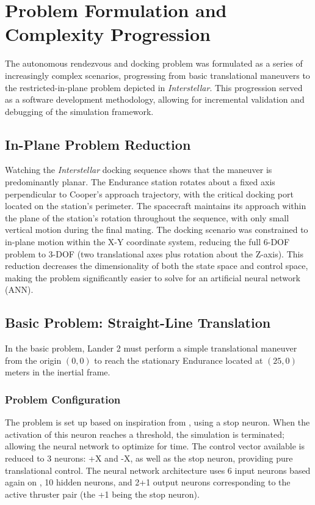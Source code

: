 \section{Problem Formulation and Complexity Progression}
The autonomous rendezvous and docking problem was formulated as a series of
increasingly complex scenarios, progressing from basic translational maneuvers
to the restricted-in-plane problem depicted in \textit{Interstellar}. This
progression served as a software development methodology, allowing for
incremental validation and debugging of the simulation framework.

\subsection{In-Plane Problem Reduction}

Watching the \textit{Interstellar} docking sequence shows that the maneuver is
predominantly planar. The Endurance station rotates about a fixed axis
perpendicular to Cooper's approach trajectory, with the critical docking port
located on the station's perimeter. The spacecraft maintains its approach
within the plane of the station's rotation throughout the sequence, with only
small vertical motion during the final mating. The docking scenario was
constrained to in-plane motion within the X-Y coordinate system, reducing the
full 6-DOF problem to 3-DOF (two translational axes plus rotation about the
Z-axis). This reduction decreases the dimensionality of both the state space
and control space, making the problem significantly easier to solve for an
artificial neural network (ANN).

\subsection{Basic Problem: Straight-Line Translation}

In the basic problem, Lander 2 must perform a simple translational maneuver
from the origin $(0, 0)$ to reach the stationary Endurance located at $(25, 0)$
meters in the inertial frame.

\subsubsection{Problem Configuration}

The problem is set up based on inspiration from \cite{leitner2010evolving},
using a stop neuron. When the activation of this neuron
reaches a threshold, the simulation is terminated; allowing the neural network
to optimize for time. The control vector available is reduced to 3 neurons: +X
and -X, as well as the stop neuron, providing pure translational control. The
neural network architecture uses 6 input neurons based again on
\cite{leitner2010evolving}, 10 hidden neurons, and 2+1 output neurons
corresponding to the active thruster pair (the +1 being the stop
neuron).

